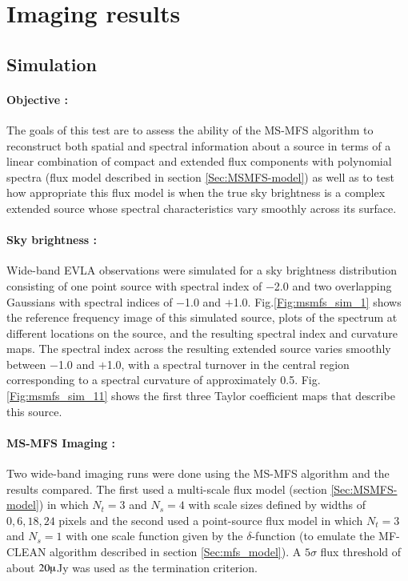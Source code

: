 \documentclass[structabstract]{stylefiles/aa}
\begin{document}
%



\section{Imaging results}\label{Sec:IMAGINGRESULTS}
\subsection{Simulation}

\paragraph{Objective : }
The goals of this test are to assess the ability of the MS-MFS algorithm 
to reconstruct both spatial and spectral 
information about a source in terms of a linear combination of compact and 
extended flux components with 
polynomial spectra (flux model described in section \ref{Sec:MSMFS-model})
as well as to test how appropriate this flux model is when the 
true sky brightness is a complex extended source whose spectral
characteristics vary smoothly across its surface.


\paragraph{Sky brightness : }
Wide-band EVLA observations were simulated for a sky brightness distribution 
consisting of one point source with spectral index of $-$2.0 and 
two overlapping Gaussians with spectral indices of $-$1.0 and $+$1.0. 
Fig.\ref{Fig:msmfs_sim_1} shows the reference
frequency image of this simulated source, 
plots of the spectrum at different locations on the source, and the resulting
spectral index and curvature maps. 
The spectral
index across the resulting extended source varies smoothly between $-$1.0 and $+$1.0,
with a spectral turnover in the central region corresponding to a spectral 
curvature of approximately 0.5. 
Fig.\ref{Fig:msmfs_sim_11} shows the first
three Taylor coefficient maps that describe this source.

\paragraph{MS-MFS Imaging : }
Two wide-band imaging runs were done using the MS-MFS algorithm and the results
compared. The first used a multi-scale flux model (section \ref{Sec:MSMFS-model}) 
in which $N_t=3$ and $N_s=4$ with scale sizes
defined by widths of $0,6,18,24$ pixels and the second used a point-source 
flux model in which $N_t=3$ and $N_s=1$ with one scale
function given by the $\delta$-function (to emulate the MF-CLEAN algorithm described 
in section \ref{Sec:mfs_model}).
A $5\sigma$ flux threshold of about $20\muup$Jy was used as the
termination criterion.
\end{document}
